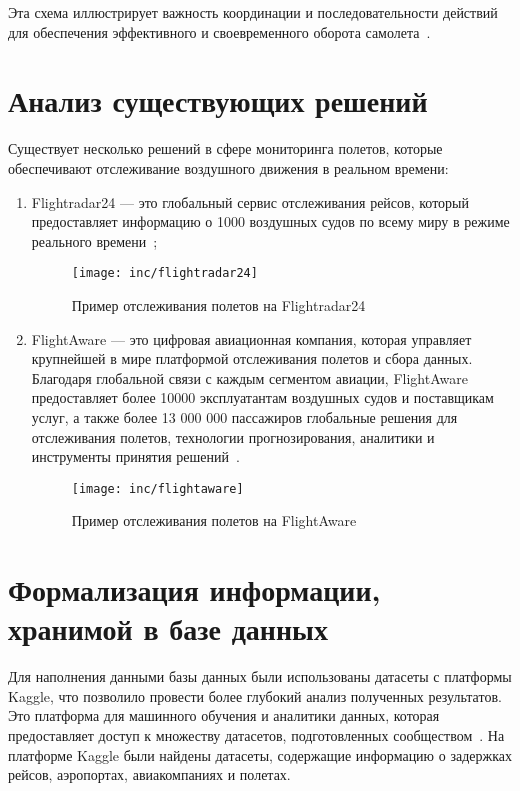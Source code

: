 Эта схема иллюстрирует важность координации и последовательности действий для обеспечения эффективного и своевременного оборота самолета~\cite{trt-timeestimation}.


\section{Анализ существующих решений}

Существует несколько решений в сфере мониторинга полетов, которые обеспечивают отслеживание воздушного движения в реальном времени:
\begin{enumerate}[label=\arabic*)]
    \item Flightradar24 --- это глобальный сервис отслеживания рейсов, который предоставляет информацию о 1000 воздушных судов по всему миру в режиме реального времени~\cite{flightradar24};
    \begin{figure}[h]
        \centering
        \texttt{[image: inc/flightradar24]}
        \caption{Пример отслеживания полетов на Flightradar24}
        \label{fig:flightradar24}
    \end{figure}
    \item FlightAware --- это цифровая авиационная компания, которая управляет крупнейшей в мире платформой отслеживания полетов и сбора данных.
    Благодаря глобальной связи с каждым сегментом авиации, FlightAware предоставляет более 10000 эксплуатантам воздушных судов и поставщикам услуг, а также более 13 000 000 пассажиров глобальные решения для отслеживания полетов, технологии прогнозирования, аналитики и инструменты принятия решений~\cite{flightaware}.
    \begin{figure}[h]
        \centering
        \texttt{[image: inc/flightaware]}
        \caption{Пример отслеживания полетов на FlightAware}
        \label{fig:flightaware}
    \end{figure}
\end{enumerate}


\section{Формализация информации, хранимой в базе данных}

Для наполнения данными базы данных были использованы датасеты с платформы Kaggle, что позволило провести более глубокий анализ полученных результатов.
Это платформа для машинного обучения и аналитики данных, которая предоставляет доступ к множеству датасетов, подготовленных сообществом~\cite{kaggle}.
На платформе Kaggle были найдены датасеты, содержащие информацию о задержках рейсов, аэропортах, авиакомпаниях и полетах.

